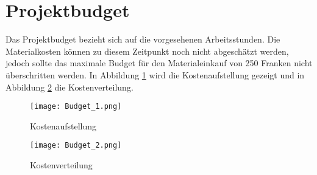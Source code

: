 \section{Projektbudget}

Das Projektbudget bezieht sich auf die vorgesehenen Arbeitsstunden. Die Materialkosten können zu diesem Zeitpunkt noch nicht abgeschätzt werden, jedoch sollte das maximale Budget für den Materialeinkauf von 250 Franken nicht überschritten werden. In Abbildung \ref{fig::Budget_1} wird die Kostenaufstellung gezeigt und in Abbildung \ref{fig::Budget_2} die Kostenverteilung.


\begin{figure}[h] 
\centering
\texttt{[image: Budget\_1.png]}%
\caption{Kostenaufstellung}%
\label{fig::Budget_1}%
\end{figure}

\begin{figure}[h] 
\centering
\texttt{[image: Budget\_2.png]}%
\caption{Kostenverteilung}%
\label{fig::Budget_2}%
\end{figure}